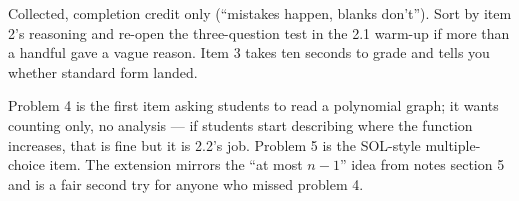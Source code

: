 \documentclass[10pt]{article}
\begin{document}
\begin{teachernote}
Collected, completion credit only (``mistakes happen, blanks don't''). Sort by item
2's reasoning and re-open the three-question test in the 2.1 warm-up if more than a
handful gave a vague reason. Item 3 takes ten seconds to grade and tells you
whether standard form landed.
\end{teachernote}

\begin{teachernote}[Homework]
Problem 4 is the first item asking students to read a polynomial graph; it wants
counting only, no analysis --- if students start describing where the function
increases, that is fine but it is 2.2's job. Problem 5 is the SOL-style
multiple-choice item. The extension mirrors the ``at most $n-1$'' idea from notes
section 5 and is a fair second try for anyone who missed problem 4.
\end{teachernote}
\end{document}
